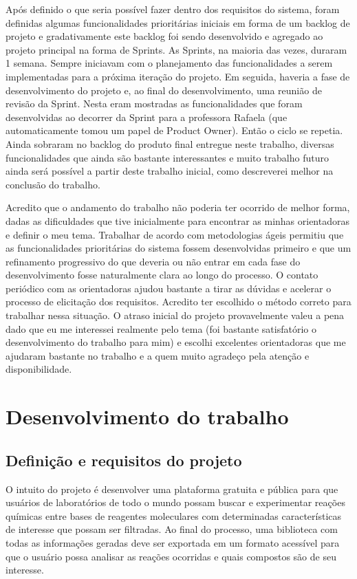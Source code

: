 \documentclass{abnt}
\begin{document}
Após definido o que seria possível fazer dentro dos requisitos do sistema, foram 
definidas algumas funcionalidades prioritárias iniciais em forma de um backlog de 
projeto e gradativamente este backlog foi sendo desenvolvido e agregado ao projeto 
principal na forma de Sprints. As Sprints, na maioria das vezes, duraram 1 semana. 
Sempre iniciavam com o planejamento das funcionalidades a serem implementadas para 
a próxima iteração do projeto. Em seguida, haveria a fase de desenvolvimento do 
projeto e, ao final do desenvolvimento, uma reunião de revisão da Sprint. Nesta 
eram mostradas as funcionalidades que foram desenvolvidas ao decorrer da Sprint 
para a professora Rafaela (que automaticamente tomou um papel de Product Owner). 
Então o ciclo se repetia. Ainda sobraram no backlog do produto final entregue neste 
trabalho, diversas funcionalidades que ainda são bastante interessantes e muito 
trabalho futuro ainda será possível a partir deste trabalho inicial, como descreverei
melhor na conclusão do trabalho.

Acredito que o andamento do trabalho não poderia ter ocorrido de melhor forma, dadas
as dificuldades que tive inicialmente para encontrar as minhas orientadoras e definir
o meu tema. Trabalhar de acordo com metodologias ágeis permitiu que as funcionalidades
prioritárias do sistema fossem desenvolvidas primeiro e que um refinamento progressivo
do que deveria ou não entrar em cada fase do desenvolvimento fosse naturalmente clara
ao longo do processo. O contato periódico com as orientadoras ajudou bastante a
tirar as dúvidas e acelerar o processo de elicitação dos requisitos. Acredito ter
escolhido o método correto para trabalhar nessa situação. O atraso inicial do projeto
provavelmente valeu a pena dado que eu me interessei realmente pelo tema (foi bastante
satisfatório o desenvolvimento do trabalho para mim) e escolhi excelentes orientadoras
que me ajudaram bastante no trabalho e a quem muito agradeço pela atenção e disponibilidade.

\chapter{Desenvolvimento do trabalho}

\section{Definição e requisitos do projeto}

O intuito do projeto é desenvolver uma plataforma gratuita e pública para que usuários
de laboratórios de todo o mundo possam buscar e experimentar reações químicas entre
bases de reagentes moleculares com determinadas características de interesse que
possam ser filtradas. Ao final do processo, uma biblioteca com todas as informações
geradas deve ser exportada em um formato acessível para que o usuário possa analisar
as reações ocorridas e quais compostos são de seu interesse.
\end{document}
